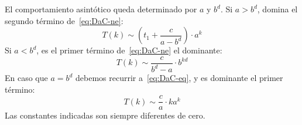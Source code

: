   El comportamiento asintótico
  queda determinado por \(a\) y \(b^d\).
  Si \(a > b^d\),
  domina el segundo término de~\eqref{eq:DaC-ne}:
  \begin{equation}
    \label{eq:DaC-gt-asymp}
    T(k)
      \sim \left( t_1 + \frac{c}{a - b^d} \right) \cdot a^k
  \end{equation}
  Si \(a < b^d\),
  es el primer término de~\eqref{eq:DaC-ne} el dominante:
  \begin{equation}
    \label{eq:DaC-lt-asymp}
    T(k)
      \sim \frac{c}{b^d - a} \cdot b^{k d}
  \end{equation}
  En caso que \(a = b^d\) debemos recurrir a~\eqref{eq:DaC-eq},
  y es dominante el primer término:
  \begin{equation}
    \label{eq:DaC-eq-asymp}
    T(k)
      \sim \frac{c}{a} \cdot k a^k
  \end{equation}
  Las constantes indicadas son siempre diferentes de cero.

